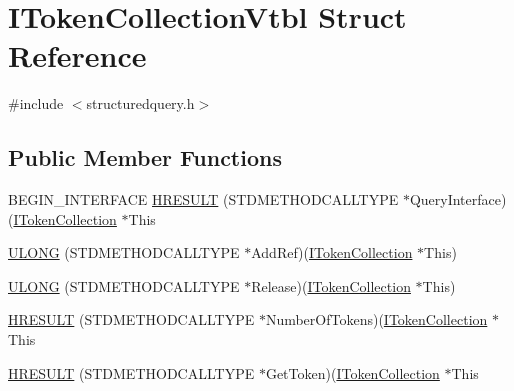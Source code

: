 \hypertarget{struct_i_token_collection_vtbl}{}\section{I\+Token\+Collection\+Vtbl Struct Reference}
\label{struct_i_token_collection_vtbl}


{\ttfamily \#include $<$structuredquery.\+h$>$}

\subsection*{Public Member Functions}
\begin{DoxyCompactItemize}
\item 
B\+E\+G\+I\+N\+\_\+\+I\+N\+T\+E\+R\+F\+A\+CE \hyperlink{struct_i_token_collection_vtbl_aeeab41c58911b04c751fe87e968a4cc6}{H\+R\+E\+S\+U\+LT} (S\+T\+D\+M\+E\+T\+H\+O\+D\+C\+A\+L\+L\+T\+Y\+PE $\ast$Query\+Interface)(\hyperlink{structuredquery_8h_af02e566d558cb1e53b43313cb871ce87}{I\+Token\+Collection} $\ast$This
\item 
\hyperlink{struct_i_token_collection_vtbl_a64e68d6f7922dc053fbdcaa8dc4d08b2}{U\+L\+O\+NG} (S\+T\+D\+M\+E\+T\+H\+O\+D\+C\+A\+L\+L\+T\+Y\+PE $\ast$Add\+Ref)(\hyperlink{structuredquery_8h_af02e566d558cb1e53b43313cb871ce87}{I\+Token\+Collection} $\ast$This)
\item 
\hyperlink{struct_i_token_collection_vtbl_a592f1d5acd242961b7be6137e54bfa58}{U\+L\+O\+NG} (S\+T\+D\+M\+E\+T\+H\+O\+D\+C\+A\+L\+L\+T\+Y\+PE $\ast$Release)(\hyperlink{structuredquery_8h_af02e566d558cb1e53b43313cb871ce87}{I\+Token\+Collection} $\ast$This)
\item 
\hyperlink{struct_i_token_collection_vtbl_a99f79a5e7450c339d5bc17c7a26df986}{H\+R\+E\+S\+U\+LT} (S\+T\+D\+M\+E\+T\+H\+O\+D\+C\+A\+L\+L\+T\+Y\+PE $\ast$Number\+Of\+Tokens)(\hyperlink{structuredquery_8h_af02e566d558cb1e53b43313cb871ce87}{I\+Token\+Collection} $\ast$This
\item 
\hyperlink{struct_i_token_collection_vtbl_af3dfd827dd19d3138e906b8e425d9d43}{H\+R\+E\+S\+U\+LT} (S\+T\+D\+M\+E\+T\+H\+O\+D\+C\+A\+L\+L\+T\+Y\+PE $\ast$Get\+Token)(\hyperlink{structuredquery_8h_af02e566d558cb1e53b43313cb871ce87}{I\+Token\+Collection} $\ast$This
\end{DoxyCompactItemize}
